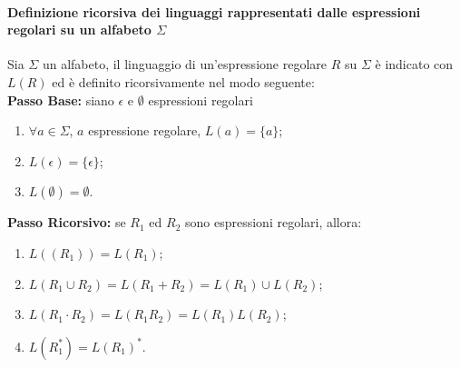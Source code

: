 \paragraph{Definizione ricorsiva dei linguaggi rappresentati dalle espressioni regolari su un alfabeto $\Sigma$}
\begin{definizione}
	Sia $\Sigma$ un alfabeto, il linguaggio di un'espressione regolare $R$ su $\Sigma$ è indicato con $L(R)$ ed è definito ricorsivamente nel modo seguente:\\
	\textbf{Passo Base:} siano $\epsilon$ e $\emptyset$ espressioni regolari
	\begin{enumerate}
		\item $\forall a \in \Sigma$, $a$ espressione regolare,  $L(a) = \{a\}$;
		\item $L(\epsilon) = \{\epsilon\}$;
		\item $L(\emptyset) = \emptyset$.
	\end{enumerate}
	\textbf{Passo Ricorsivo:} se $R_1$ ed $R_2$ sono espressioni regolari, allora:
	\begin{enumerate}
		\item $L((R_1)) = L(R_1)$;
		\item $L(R_1 \cup R_2) = L(R_1 + R_2) = L(R_1) \cup L(R_2)$;
		\item $L(R_1 \cdot R_2) = L(R_1R_2) = L(R_1)L(R_2)$;
		\item $L(R_1^*) = L(R_1)^*$.
	\end{enumerate}
\end{definizione}